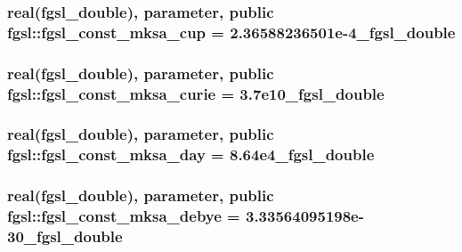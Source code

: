 \subsubsection[{fgsl\+\_\+const\+\_\+mksa\+\_\+cup}]{\setlength{\rightskip}{0pt plus 5cm}real({\bf fgsl\+\_\+double}), parameter, public fgsl\+::fgsl\+\_\+const\+\_\+mksa\+\_\+cup = 2.\+36588236501e-\/4\+\_\+fgsl\+\_\+double}\label{namespacefgsl_af7eed4749b386e3a913ae8e18cadc2bc}
\hypertarget{namespacefgsl_a96bbfcd3e0e6a9190e86a1a909b7407b}{}
\subsubsection[{fgsl\+\_\+const\+\_\+mksa\+\_\+curie}]{\setlength{\rightskip}{0pt plus 5cm}real({\bf fgsl\+\_\+double}), parameter, public fgsl\+::fgsl\+\_\+const\+\_\+mksa\+\_\+curie = 3.\+7e10\+\_\+fgsl\+\_\+double}\label{namespacefgsl_a96bbfcd3e0e6a9190e86a1a909b7407b}
\hypertarget{namespacefgsl_af69acf253e04452510d9ec67efa458d2}{}
\subsubsection[{fgsl\+\_\+const\+\_\+mksa\+\_\+day}]{\setlength{\rightskip}{0pt plus 5cm}real({\bf fgsl\+\_\+double}), parameter, public fgsl\+::fgsl\+\_\+const\+\_\+mksa\+\_\+day = 8.\+64e4\+\_\+fgsl\+\_\+double}\label{namespacefgsl_af69acf253e04452510d9ec67efa458d2}
\hypertarget{namespacefgsl_ad4022c36598c9b49cb3bc9497fcdc06c}{}
\subsubsection[{fgsl\+\_\+const\+\_\+mksa\+\_\+debye}]{\setlength{\rightskip}{0pt plus 5cm}real({\bf fgsl\+\_\+double}), parameter, public fgsl\+::fgsl\+\_\+const\+\_\+mksa\+\_\+debye = 3.\+33564095198e-\/30\+\_\+fgsl\+\_\+double}\label{namespacefgsl_ad4022c36598c9b49cb3bc9497fcdc06c}
\hypertarget{namespacefgsl_a17365a3e64a2dd83aea9ebba6757fd7b}{}
